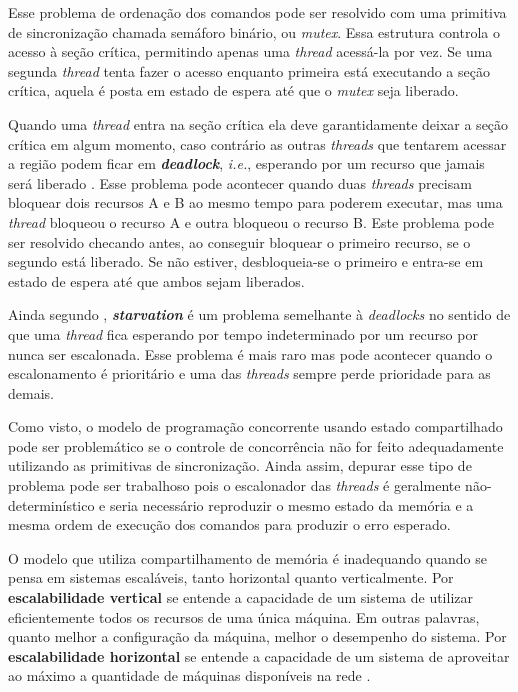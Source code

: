 Esse problema de ordenação dos comandos pode ser resolvido com uma primitiva de sincronização chamada semáforo binário, ou \textit{mutex}. Essa estrutura controla o acesso à seção crítica, permitindo apenas uma \textit{thread} acessá-la por vez. Se uma segunda \textit{thread} tenta fazer o acesso enquanto primeira está executando a seção crítica, aquela é posta em estado de espera até que o \textit{mutex} seja liberado. 

Quando uma \textit{thread} entra na seção crítica ela deve garantidamente deixar a seção crítica em algum momento, caso contrário as outras \textit{threads} que tentarem acessar a região podem ficar em \textit{\textbf{deadlock}}, \textit{i.e.}, esperando por um recurso que jamais será liberado \cite[p. 217]{Silberschatz2012}. Esse problema pode acontecer quando duas \textit{threads} precisam bloquear dois recursos A e B ao mesmo tempo para poderem executar, mas uma \textit{thread} bloqueou o recurso A e outra bloqueou o recurso B. Este problema pode ser resolvido checando antes, ao conseguir bloquear o primeiro recurso, se o segundo está liberado. Se não estiver, desbloqueia-se o primeiro e entra-se em estado de espera até que ambos sejam liberados.

Ainda segundo , \textbf{\textit{starvation}} é um problema semelhante à \textit{deadlocks} no sentido de que uma \textit{thread} fica esperando por tempo indeterminado por um recurso por nunca ser escalonada. Esse problema é mais raro mas pode acontecer quando o escalonamento é prioritário e uma das \textit{threads} sempre perde prioridade para as demais. 

Como visto, o modelo de programação concorrente usando estado compartilhado pode ser problemático se o controle de concorrência não for feito adequadamente utilizando as primitivas de sincronização. Ainda assim, depurar esse tipo de problema pode ser trabalhoso pois o escalonador das \textit{threads} é geralmente não-determinístico e seria necessário reproduzir o mesmo estado da memória e a mesma ordem de execução dos comandos para produzir o erro esperado. 

O modelo que utiliza compartilhamento de memória é inadequando quando se pensa em sistemas escaláveis, tanto horizontal quanto verticalmente. Por \textbf{escalabilidade vertical} se entende a capacidade de um sistema de utilizar eficientemente todos os recursos de uma única máquina. Em outras palavras, quanto melhor a configuração da máquina, melhor o desempenho do sistema. Por \textbf{escalabilidade horizontal} se entende a capacidade de um sistema de aproveitar ao máximo a quantidade de máquinas disponíveis na rede \cite{Abbadi2011}. 

